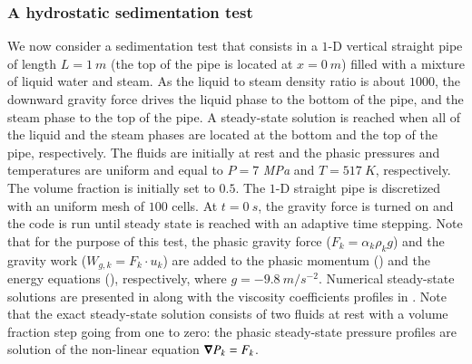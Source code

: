 \documentclass[preprint,10pt]{elsarticle}
\begin{document}
\subsubsection{A hydrostatic sedimentation test}\label{sec:}
%
We now consider a sedimentation test that consists in a $1$-D vertical straight pipe of length $L=1 \ m$ (the top of the pipe is located at $x=0 \ m$) filled with a mixture of liquid water and steam. As the liquid to steam density ratio is about $1000$, the downward gravity force drives the liquid phase to the bottom of the pipe, and the steam phase to the top of the pipe. A steady-state solution is reached when all of the liquid and the steam phases are located at the bottom and the top of the pipe, respectively. The fluids are initially at rest and the phasic pressures and temperatures are uniform and equal to $P=7$ {\it MPa} and $T=517 \ K$, respectively. The volume fraction is initially set to $0.5$. The $1$-D straight pipe is discretized with an uniform mesh of $100$ cells. At $t=0 \ s$, the gravity force is turned on and the code is run until steady state is reached with an adaptive time stepping. Note that for the purpose of this test, the phasic gravity force ($F_k = \alpha_k \rho_k g$) and the gravity work ($W_{g,k}=F_k \cdot u_k$) are added to the phasic momentum () and the energy equations (), respectively, where $g=-9.8 \ m / s^{-2}$. Numerical steady-state solutions are presented in  along with the viscosity coefficients profiles in . Note that the exact steady-state solution consists of two fluids at rest with a volume fraction step going from one to zero: the phasic steady-state pressure profiles are solution of the non-linear equation $\boldsymbol\nabla P_k = F_k$. 
%
\end{document}
